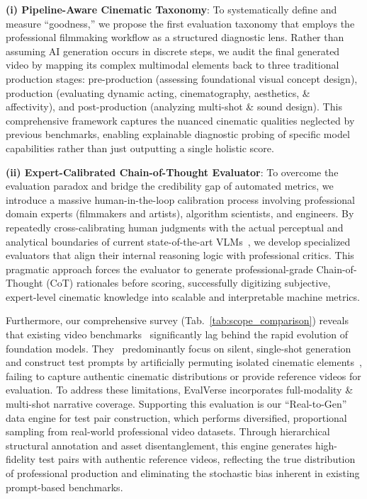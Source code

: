 \documentclass{llmxive}
\begin{document}
\textbf{(i) Pipeline-Aware Cinematic Taxonomy}: To systematically define and measure ``goodness,'' we propose the first evaluation taxonomy that employs the professional filmmaking workflow as a structured diagnostic lens. Rather than assuming AI generation occurs in discrete steps, we audit the final generated video by mapping its complex multimodal elements back to three traditional production stages: pre-production (assessing foundational visual concept design), production (evaluating dynamic acting, cinematography, aesthetics, \& affectivity), and post-production (analyzing multi-shot \& sound design). This comprehensive framework captures the nuanced cinematic qualities neglected by previous benchmarks, enabling explainable diagnostic probing of specific model capabilities rather than just outputting a single holistic score.
    
\textbf{(ii) Expert-Calibrated Chain-of-Thought Evaluator}: To overcome the evaluation paradox and bridge the credibility gap of automated metrics, we introduce a massive human-in-the-loop calibration process involving professional domain experts (filmmakers and artists), algorithm scientists, and engineers. By repeatedly cross-calibrating human judgments with the actual perceptual and analytical boundaries of current state-of-the-art VLMs~\cite{gemini,Qwen3-VL}, we develop specialized evaluators that align their internal reasoning logic with professional critics. This pragmatic approach forces the evaluator to generate professional-grade Chain-of-Thought (CoT) rationales before scoring, successfully digitizing subjective, expert-level cinematic knowledge into scalable and interpretable machine metrics.

Furthermore, our comprehensive survey (Tab.~\ref{tab:scope_comparison}) reveals that existing video benchmarks~\cite{evalcrafter,vbench,vbench++,vbench2} significantly lag behind the rapid evolution of foundation models. They~\cite{cinetechbench,univbench,msvbench,muss} predominantly focus on silent, single-shot generation and construct test prompts by artificially permuting isolated cinematic elements~\cite{stable_cinemetrics}, failing to capture authentic cinematic distributions or provide reference videos for evaluation. To address these limitations, EvalVerse incorporates full-modality \& multi-shot narrative coverage. Supporting this evaluation is our ``Real-to-Gen'' data engine for test pair construction, which performs diversified, proportional sampling from real-world professional video datasets. Through hierarchical structural annotation and asset disentanglement, this engine generates high-fidelity test pairs with authentic reference videos, reflecting the true distribution of professional production and eliminating the stochastic bias inherent in existing prompt-based benchmarks.
\end{document}
